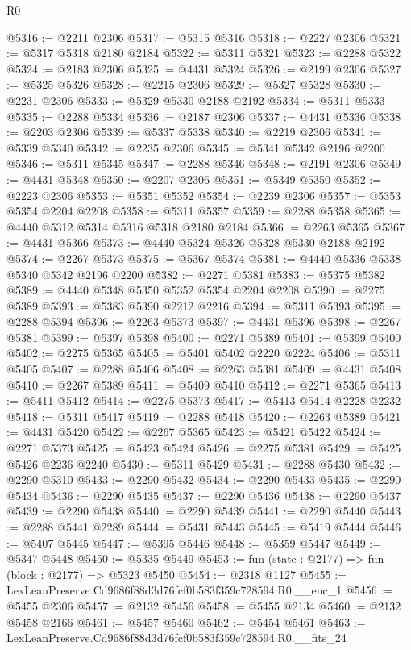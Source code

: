 \begin{lexlean}{R0}
\begin{coremodule}
@5316 := @2211 @2306
@5317 := @5315 @5316
@5318 := @2227 @2306
@5321 := @5317 @5318 @2180 @2184
@5322 := @5311 @5321
@5323 := @2288 @5322
@5324 := @2183 @2306
@5325 := @4431 @5324
@5326 := @2199 @2306
@5327 := @5325 @5326
@5328 := @2215 @2306
@5329 := @5327 @5328
@5330 := @2231 @2306
@5333 := @5329 @5330 @2188 @2192
@5334 := @5311 @5333
@5335 := @2288 @5334
@5336 := @2187 @2306
@5337 := @4431 @5336
@5338 := @2203 @2306
@5339 := @5337 @5338
@5340 := @2219 @2306
@5341 := @5339 @5340
@5342 := @2235 @2306
@5345 := @5341 @5342 @2196 @2200
@5346 := @5311 @5345
@5347 := @2288 @5346
@5348 := @2191 @2306
@5349 := @4431 @5348
@5350 := @2207 @2306
@5351 := @5349 @5350
@5352 := @2223 @2306
@5353 := @5351 @5352
@5354 := @2239 @2306
@5357 := @5353 @5354 @2204 @2208
@5358 := @5311 @5357
@5359 := @2288 @5358
@5365 := @4440 @5312 @5314 @5316 @5318 @2180 @2184
@5366 := @2263 @5365
@5367 := @4431 @5366
@5373 := @4440 @5324 @5326 @5328 @5330 @2188 @2192
@5374 := @2267 @5373
@5375 := @5367 @5374
@5381 := @4440 @5336 @5338 @5340 @5342 @2196 @2200
@5382 := @2271 @5381
@5383 := @5375 @5382
@5389 := @4440 @5348 @5350 @5352 @5354 @2204 @2208
@5390 := @2275 @5389
@5393 := @5383 @5390 @2212 @2216
@5394 := @5311 @5393
@5395 := @2288 @5394
@5396 := @2263 @5373
@5397 := @4431 @5396
@5398 := @2267 @5381
@5399 := @5397 @5398
@5400 := @2271 @5389
@5401 := @5399 @5400
@5402 := @2275 @5365
@5405 := @5401 @5402 @2220 @2224
@5406 := @5311 @5405
@5407 := @2288 @5406
@5408 := @2263 @5381
@5409 := @4431 @5408
@5410 := @2267 @5389
@5411 := @5409 @5410
@5412 := @2271 @5365
@5413 := @5411 @5412
@5414 := @2275 @5373
@5417 := @5413 @5414 @2228 @2232
@5418 := @5311 @5417
@5419 := @2288 @5418
@5420 := @2263 @5389
@5421 := @4431 @5420
@5422 := @2267 @5365
@5423 := @5421 @5422
@5424 := @2271 @5373
@5425 := @5423 @5424
@5426 := @2275 @5381
@5429 := @5425 @5426 @2236 @2240
@5430 := @5311 @5429
@5431 := @2288 @5430
@5432 := @2290 @5310
@5433 := @2290 @5432
@5434 := @2290 @5433
@5435 := @2290 @5434
@5436 := @2290 @5435
@5437 := @2290 @5436
@5438 := @2290 @5437
@5439 := @2290 @5438
@5440 := @2290 @5439
@5441 := @2290 @5440
@5443 := @2288 @5441 @2289
@5444 := @5431 @5443
@5445 := @5419 @5444
@5446 := @5407 @5445
@5447 := @5395 @5446
@5448 := @5359 @5447
@5449 := @5347 @5448
@5450 := @5335 @5449
@5453 := fun (state : @2177) => fun (block : @2177) => @5323 @5450
@5454 := @2318 @1127
@5455 := LexLeanPreserve.Cd9686f88d3d76fcf0b583f359c728594.R0.__enc_1
@5456 := @5455 @2306
@5457 := @2132 @5456
@5458 := @5455 @2134
@5460 := @2132 @5458 @2166
@5461 := @5457 @5460
@5462 := @5454 @5461
@5463 := LexLeanPreserve.Cd9686f88d3d76fcf0b583f359c728594.R0.__fits_24

\end{coremodule}
\end{lexlean}
